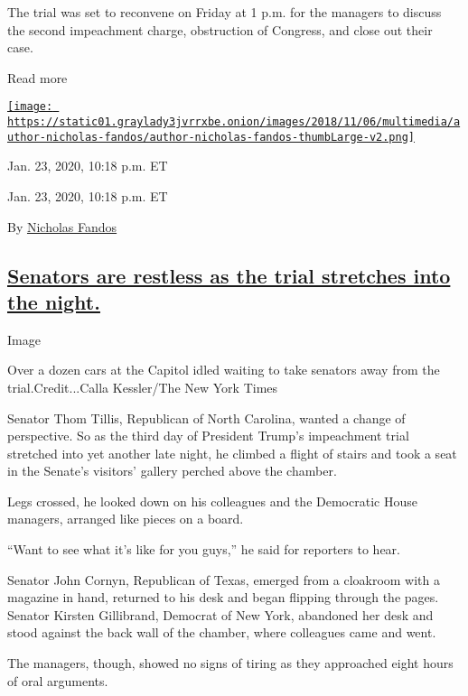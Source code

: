 The trial was set to reconvene on Friday at 1 p.m. for the managers to
discuss the second impeachment charge, obstruction of Congress, and
close out their case.

Read more

\href{https://www.nytimes3xbfgragh.onion/by/nicholas-fandos}{\texttt{[image: https://static01.graylady3jvrrxbe.onion/images/2018/11/06/multimedia/author-nicholas-fandos/author-nicholas-fandos-thumbLarge-v2.png]}}

Jan. 23, 2020, 10:18 p.m. ET

Jan. 23, 2020, 10:18 p.m. ET

By \href{https://www.nytimes3xbfgragh.onion/by/nicholas-fandos}{Nicholas
Fandos}

\hypertarget{senators-are-restless-as-the-trial-stretches-into-the-night}{%
\subsection{\texorpdfstring{\protect\hyperlink{senators-trial-night}{Senators
are restless as the trial stretches into the
night.}}{Senators are restless as the trial stretches into the night.}}\label{senators-are-restless-as-the-trial-stretches-into-the-night}}

Image

Over a dozen cars at the Capitol idled waiting to take senators away
from the trial.Credit...Calla Kessler/The New York Times

Senator Thom Tillis, Republican of North Carolina, wanted a change of
perspective. So as the third day of President Trump's impeachment trial
stretched into yet another late night, he climbed a flight of stairs and
took a seat in the Senate's visitors' gallery perched above the chamber.

Legs crossed, he looked down on his colleagues and the Democratic House
managers, arranged like pieces on a board.

``Want to see what it's like for you guys,'' he said for reporters to
hear.

Senator John Cornyn, Republican of Texas, emerged from a cloakroom with
a magazine in hand, returned to his desk and began flipping through the
pages. Senator Kirsten Gillibrand, Democrat of New York, abandoned her
desk and stood against the back wall of the chamber, where colleagues
came and went.

The managers, though, showed no signs of tiring as they approached eight
hours of oral arguments.

